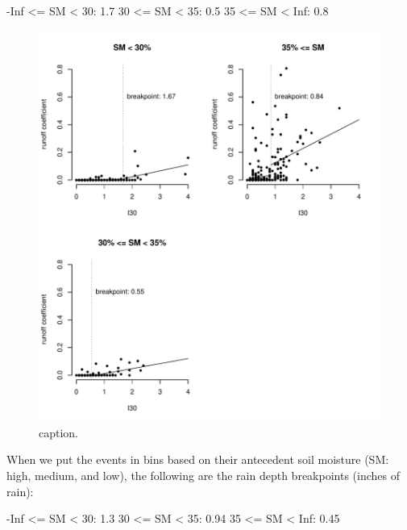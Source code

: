 \documentclass[12pt]{article}
\begin{document}
\begin{Schunk}
\begin{Soutput}
-Inf <= SM < 30: 1.7
30 <= SM < 35: 0.5
35 <= SM < Inf: 0.8
\end{Soutput}
\end{Schunk}



\begin{figure}
    \begin{center}
\includegraphics{runoff-I30_binned}
    \end{center}
    \caption{caption.\label{I30_binned}}
\end{figure}


\vspace{10mm}
When we put the events in bins based on their antecedent soil moisture (SM: high, medium, and low), the following are the rain depth breakpoints (inches of rain):

\begin{Schunk}
\begin{Soutput}
-Inf <= SM < 30: 1.3
30 <= SM < 35: 0.94
35 <= SM < Inf: 0.45
\end{Soutput}
\end{Schunk}
\end{document}
